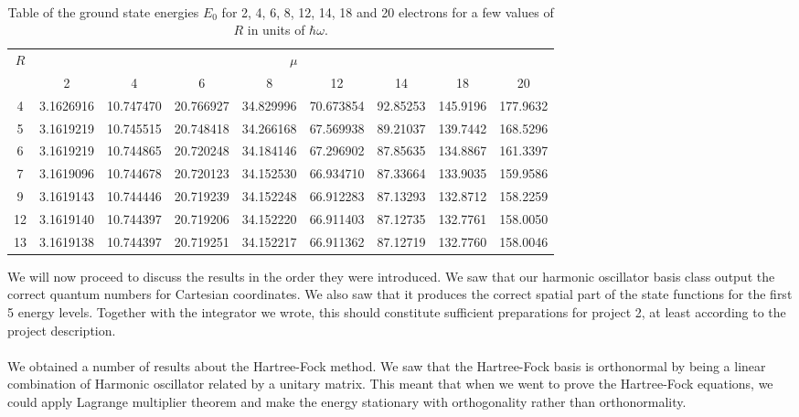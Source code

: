 \documentclass[11pt,english,a4paper]{article}
\begin{document}
\\%
\begin{table}
\begin{center}
\begin{tabular}{c c c c c c c c c}
$R$ & \multicolumn{8}{c}{$\mu$}\\
  & 2         & 4         & 6         & 8         &12         &14        & 18       & 20\\
  \hline
4 & 3.1626916 & 10.747470 & 20.766927 & 34.829996 & 70.673854 & 92.85253 & 145.9196 & 177.9632\\
5 & 3.1619219 & 10.745515 & 20.748418 & 34.266168 & 67.569938 & 89.21037 & 139.7442 & 168.5296\\
6 & 3.1619219 & 10.744865 & 20.720248 & 34.184146 & 67.296902 & 87.85635 & 134.8867 & 161.3397\\
7 & 3.1619096 & 10.744678 & 20.720123 & 34.152530 & 66.934710 & 87.33664 & 133.9035 & 159.9586\\
9 & 3.1619143 & 10.744446 & 20.719239 & 34.152248 & 66.912283 & 87.13293 & 132.8712 & 158.2259\\
12& 3.1619140  & 10.744397&  20.719206 & 34.152220 & 66.911403 & 87.12735 & 132.7761  & 158.0050 \\
13& 3.1619138  & 10.744397&  20.719251 & 34.152217 & 66.911362 & 87.12719  & 132.7760  & 158.0046 \\
\end{tabular}
\end{center}
\caption{Table of the ground state energies $E_0$ for 2, 4, 6, 8, 12, 14, 18 and 20 electrons for a few values of $R$ in units of $\hbar \omega$.} \label{tbl:energies}
\end{table}%
We will now proceed to discuss the results in the order they were introduced. We saw that our harmonic oscillator basis class output the correct quantum numbers for Cartesian coordinates. We also saw that it produces the correct spatial part of the state functions for the first 5 energy levels. Together with the integrator we wrote, this should constitute sufficient preparations for project 2, at least according to the project description. \\
\\
We obtained a number of results about the Hartree-Fock method. We saw that the Hartree-Fock basis is orthonormal by being a linear combination of Harmonic oscillator related by a unitary matrix. This meant that when we went to prove the Hartree-Fock equations, we could apply Lagrange multiplier theorem and make the energy stationary with orthogonality rather than orthonormality.\\
\end{document}

